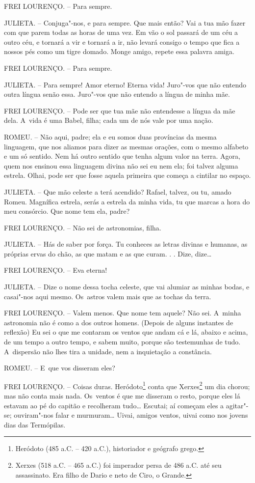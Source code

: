 FREI LOURENÇO. -- Para sempre.

JULIETA. -- Conjuga"-nos, e para sempre. Que mais então? Vai a tua mão
fazer com que parem todas as horas de uma vez. Em vão o sol passará de
um céu a outro céu, e tornará a vir e tornará a ir, não levará consigo o
tempo que fica a nossos pés como um tigre domado. Monge amigo, repete
essa palavra amiga.

FREI LOURENÇO. -- Para sempre.

JULIETA. -- Para sempre! Amor eterno! Eterna vida! Juro"-vos que não
entendo outra língua senão essa. Juro"-vos que não entendo a língua de
minha mãe.

FREI LOURENÇO. -- Pode ser que tua mãe não entendesse a língua da mãe
dela. A~vida é uma Babel, filha; cada um de nós vale por uma nação.

ROMEU. -- Não aqui, padre; ela e eu somos duas províncias da mesma
linguagem, que nos aliamos para dizer as mesmas orações, com o mesmo
alfabeto e um só sentido. Nem há outro sentido que tenha algum valor na
terra. Agora, quem nos ensinou essa linguagem divina não sei eu nem ela;
foi talvez alguma estrela. Olhai, pode ser que fosse aquela primeira que
começa a cintilar no espaço.

JULIETA. -- Que mão celeste a terá acendido? Rafael, talvez, ou tu,
amado Romeu. Magnífica estrela, serás a estrela da minha vida, tu que
marcas a hora do meu consórcio. Que nome tem ela, padre?

FREI LOURENÇO. -- Não sei de astronomias, filha.

JULIETA. -- Hás de saber por força. Tu conheces as letras divinas e
humanas, as próprias ervas do chão, as que matam e as que curam. . .
Dize, dize\ldots{}

FREI LOURENÇO. -- Eva eterna!

JULIETA. -- Dize o nome dessa tocha celeste, que vai alumiar as minhas
bodas, e casai"-nos aqui mesmo. Os~astros valem mais que as tochas da
terra.

FREI LOURENÇO. -- Valem menos. Que nome tem aquele? Não sei. A~minha
astronomia não é como a dos outros homens. (Depois de alguns instantes
de reflexão) Eu sei o que me contaram os ventos que andam cá e lá,
abaixo e acima, de um tempo a outro tempo, e sabem muito, porque são
testemunhas de tudo. A~dispersão não lhes tira a unidade, nem a
inquietação a constância.

ROMEU. -- E~que vos disseram eles?

FREI LOURENÇO. -- Coisas duras. Heródoto\footnote{Heródoto (485 a.C. --
  420 a.C.), historiador e geógrafo grego.} conta que Xerxes\footnote{Xerxes
   (518 a.C. -- 465 a.C.) foi imperador persa de 486 a.C. até seu
  assassinato. Era filho de Dario  e neto de Ciro, o Grande.} um dia
chorou; mas não conta mais nada. Os~ventos é que me disseram o resto,
porque eles lá estavam ao pé do capitão e recolheram tudo\ldots{} Escutai; aí
começam eles a agitar"-se; ouviram"-nos falar e murmuram\ldots{} Uivai, amigos
ventos, uivai como nos jovens dias das Termópilas.

